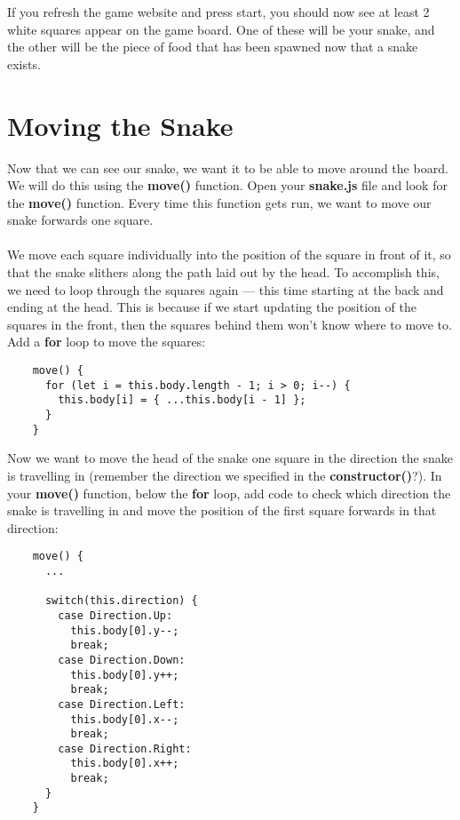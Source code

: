 \documentclass{article}
\begin{document}
  \noindent If you refresh the game website and press start, you should now see at least 2
  white squares appear on the game board. One of these will be your snake, and the other will
  be the piece of food that has been spawned now that a snake exists.

  \pagebreak
  \section{Moving the Snake}
  Now that we can see our snake, we want it to be able to move around the board. We will do 
  this using the \textbf{move()} function. Open your \textbf{snake.js} file and look for the
  \textbf{move()} function. Every time this function gets run, we want to move our snake forwards
  one square. \\\\
  We move each square individually into the position of the square in front of it, so that the
  snake slithers along the path laid out by the head. To accomplish this, we need to loop through
  the squares again --- this time starting at the back and ending at the head. This is because
  if we start updating the position of the squares in the front, then the squares behind them
  won't know where to move to. Add a \textbf{for} loop to move the squares:

  \begin{verbatim}
    move() {
      for (let i = this.body.length - 1; i > 0; i--) {
        this.body[i] = { ...this.body[i - 1] };
      }
    }
  \end{verbatim}

  \noindent Now we want to move the head of the snake one square in the direction the snake
  is travelling in (remember the direction we specified in the \textbf{constructor()}?). In 
  your \textbf{move()} function, below the \textbf{for} loop, add code to check which
  direction the snake is travelling in and move the position of the first square forwards in
  that direction:

  \begin{verbatim}
    move() {
      ...

      switch(this.direction) {
        case Direction.Up:
          this.body[0].y--;
          break;
        case Direction.Down:
          this.body[0].y++;
          break;
        case Direction.Left:
          this.body[0].x--;
          break;
        case Direction.Right:
          this.body[0].x++;
          break;
      }
    }
  \end{verbatim}
\end{document}

